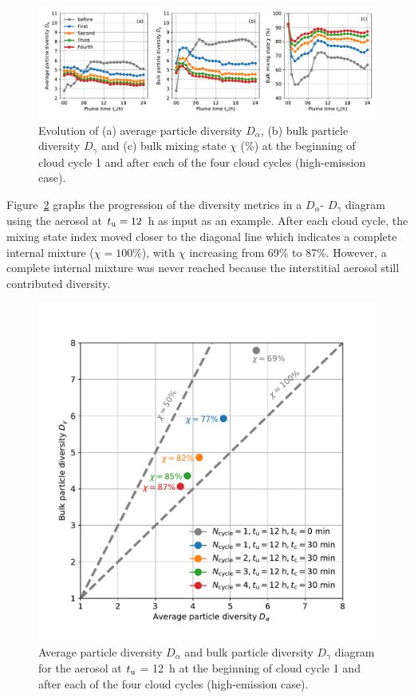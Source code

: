 \documentclass[edeposit,fullpage]{uiucthesis2009}
\begin{document}
\begin{figure}
    \centering
    \includegraphics[scale=0.43]{chap3_figs/fig8.pdf}
    \caption{Evolution of (a) average particle diversity $D_{\alpha}$,
      (b) bulk particle diversity $D_{\gamma}$ and (c) bulk mixing state
      $\chi$ ($\%$) at the beginning of cloud cycle 1 and after each
      of the four cloud cycles (high-emission case).}
    \label{fig:bulk_chi}
\end{figure}

Figure~\ref{fig:chi_diagram} graphs the progression of the diversity
metrics in a $D_{\alpha}$- $D_{\gamma}$ diagram using the aerosol at
$t_{\rm u} = 12$~h as input as an example. After each cloud cycle, the
mixing state index moved closer to the diagonal line which indicates a
complete internal mixture ($\chi = 100$\%), with $\chi$ increasing from
69\% to 87\%. However, a complete internal mixture was never reached
because the interstitial aerosol still contributed diversity.

\begin{figure}
    \centering
    \includegraphics[scale=0.43]{chap3_figs/fig9.pdf}
    \caption{Average particle diversity $D_{\alpha}$ and bulk particle
      diversity $D_{\gamma}$ diagram for the aerosol at $t_{\rm u}$ =
      12~h at the beginning of cloud cycle 1 and after each of the
      four cloud cycles (high-emission case). }
    \label{fig:chi_diagram}
\end{figure}
\end{document}
